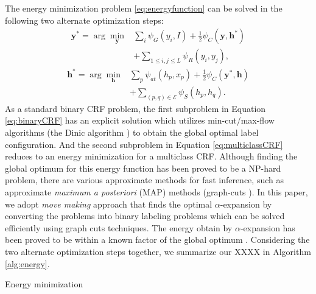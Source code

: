 The energy minimization problem \eqref{eq:energyfunction} can be solved in the following two alternate optimization steps:
\begin{equation}
    \label{eq:binaryCRF}
    \begin{aligned}
        \boldsymbol{y}^* = \arg\min_{\boldsymbol{y}} &\sum_{i} {\psi_{G}(y_i,I)} + \frac{1}{2} \psi_{C}(\boldsymbol{y},\boldsymbol{h}^*) \\ &+ \sum_{1 \le i,j \le L} {\psi_{R}(y_i,y_j)},
    \end{aligned}
\end{equation}
\begin{equation}
    \label{eq:multiclassCRF}
    \begin{aligned}
        \boldsymbol{h}^* = \arg\min_{\boldsymbol{h}} &\sum_{p} {\psi_{at}(h_p,x_p)} + \frac{1}{2} \psi_{C}(\boldsymbol{y}^*,\boldsymbol{h}) \\ &+ \sum_{(p,q) \in \mathcal{E}}{\psi_{S}(h_p,h_q)}.
    \end{aligned}
\end{equation}
As a standard binary CRF problem, the first subproblem in Equation \eqref{eq:binaryCRF} has an explicit solution which utilizes min-cut/max-flow algorithms (\eg the Dinic algorithm \cite{dinits1970algorithm}) to obtain the global optimal label configuration. And the second subproblem in Equation \eqref{eq:multiclassCRF} reduces to an energy minimization for a multiclass CRF. Although finding the global optimum for this energy function has been proved to be a NP-hard problem, there are various approximate methods for fast inference, such as approximate \textit{maximum a posteriori} (MAP) methods (\eg graph-cuts \cite{boykov2001fast}). In this paper, we adopt \textit{move making} approach \cite{boykov2001fast} that finds the optimal $\alpha$-expansion \cite{boykov2001fast,kolmogorov2004energy} by converting the problems into binary labeling  problems which can be solved efficiently using graph cuts techniques. The energy obtain by $\alpha$-expansion has been proved to be within a known factor of the global optimum \cite{boykov2001fast}. Considering the two alternate optimization steps together, we summarize our XXXX in Algorithm \ref{alg:energy}.


\begin{algorithm}[htb]
    \caption{ Energy minimization }
    \label{alg:energy}
    \begin{algorithmic}[1]
    \end{algorithmic}
\end{algorithm}


